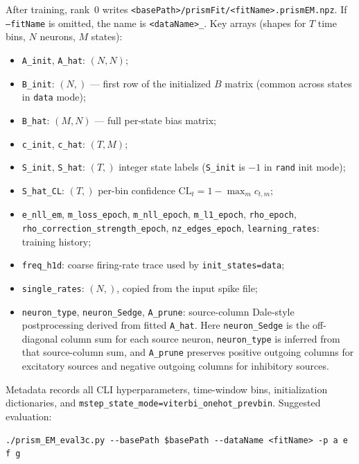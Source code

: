 \documentclass[11pt]{article}
\begin{document}
After training, rank~0 writes \texttt{<basePath>/prismFit/<fitName>.prismEM.npz}.
If \texttt{--fitName} is omitted, the name is
\texttt{<dataName>\_<hash4>}.
Key arrays (shapes for \(T\) time bins, \(N\) neurons, \(M\) states):
\begin{itemize}
  \item \texttt{A\_init}, \texttt{A\_hat}: \((N,N)\);
  \item \texttt{B\_init}: \((N,)\) --- first row of the initialized \(B\) matrix
        (common across states in \texttt{data} mode);
  \item \texttt{B\_hat}: \((M,N)\) --- full per-state bias matrix;
  \item \texttt{c\_init}, \texttt{c\_hat}: \((T,M)\);
  \item \texttt{S\_init}, \texttt{S\_hat}: \((T,)\) integer state labels
        (\texttt{S\_init} is \(-1\) in \texttt{rand} init mode);
  \item \texttt{S\_hat\_CL}: \((T,)\) per-bin confidence
        \(\mathrm{CL}_t = 1-\max_m c_{t,m}\);
  \item \texttt{e\_nll\_em}, \texttt{m\_loss\_epoch}, \texttt{m\_nll\_epoch},
        \texttt{m\_l1\_epoch}, \texttt{rho\_epoch},
        \texttt{rho\_correction\_strength\_epoch},
        \texttt{nz\_edges\_epoch}, \texttt{learning\_rates}: training history;
  \item \texttt{freq\_h1d}: coarse firing-rate trace used by
        \texttt{init\_states=data};
  \item \texttt{single\_rates}: \((N,)\), copied from the input spike file;
  \item \texttt{neuron\_type}, \texttt{neuron\_Sedge}, \texttt{A\_prune}:
        source-column Dale-style postprocessing derived from fitted
        \texttt{A\_hat}. Here \texttt{neuron\_Sedge} is the off-diagonal
        column sum for each source neuron, \texttt{neuron\_type} is inferred
        from that source-column sum, and \texttt{A\_prune} preserves
        positive outgoing columns for excitatory sources and negative
        outgoing columns for inhibitory sources.
\end{itemize}
Metadata records all CLI hyperparameters, time-window bins, initialization
dictionaries, and \texttt{mstep\_state\_mode=viterbi\_onehot\_prevbin}.
Suggested evaluation:
\begin{verbatim}
./prism_EM_eval3c.py --basePath $basePath --dataName <fitName> -p a e f g
\end{verbatim}
\end{document}

